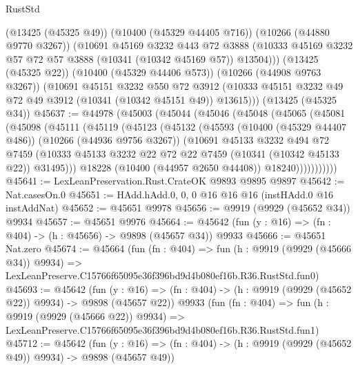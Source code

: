 \begin{lexlean}{RustStd}
\begin{coremodule}
        (@13425 (@45325 @49))
        (@10400 (@45329 @44405 @716))
        (@10266 (@44880 @9770 @3267))
        (@10691
          @45169
          @3232
          @443
          @72
          @3888
          (@10333 @45169 @3232 @57 @72 @57 @3888 (@10341 (@10342 @45169 @57)) @13504)))
      (@13425 (@45325 @22))
      (@10400 (@45329 @44406 @573))
      (@10266 (@44908 @9763 @3267))
      (@10691
        @45151
        @3232
        @550
        @72
        @3912
        (@10333 @45151 @3232 @49 @72 @49 @3912 (@10341 (@10342 @45151 @49)) @13615)))
    (@13425 (@45325 @34))
@45637 := @44978
    (@45003
      (@45044
        (@45046
          (@45048
            (@45065
              (@45081
                (@45098
                  (@45111
                    (@45119
                      (@45123
                        (@45132
                          (@45593
                            (@10400 (@45329 @44407 @486))
                            (@10266 (@44936 @9756 @3267))
                            (@10691
                              @45133
                              @3232
                              @494
                              @72
                              @7459
                              (@10333
                                @45133
                                @3232
                                @22
                                @72
                                @22
                                @7459
                                (@10341 (@10342 @45133 @22))
                                @31495)))
                          @18228
                          (@10400 (@44957 @2650 @44408))
                          @18240)))))))))))
@45641 := LexLeanPreservation.Rust.CrateOK @9893 @9895 @9897
@45642 := Nat.casesOn.{0}
@45651 := HAdd.hAdd.{0, 0, 0} @16 @16 @16 (instHAdd.{0} @16 instAddNat)
@45652 := @45651 @9978
@45656 := @9919 (@9929 (@45652 @34)) @9934
@45657 := @45651 @9976
@45664 := @45642 (fun (y : @16) => (fn : @404) -> (h : @45656) -> @9898 (@45657 @34)) @9933
@45666 := @45651 Nat.zero
@45674 := @45664
    (fun (fn : @404) =>
    fun (h : @9919 (@9929 (@45666 @34)) @9934) =>
    LexLeanPreserve.C15766f65095e36f396bd9d4b080ef16b.R36.RustStd.fun0)
@45693 := @45642
    (fun (y : @16) => (fn : @404) -> (h : @9919 (@9929 (@45652 @22)) @9934) -> @9898 (@45657 @22))
    @9933
    (fun (fn : @404) =>
    fun (h : @9919 (@9929 (@45666 @22)) @9934) =>
    LexLeanPreserve.C15766f65095e36f396bd9d4b080ef16b.R36.RustStd.fun1)
@45712 := @45642
    (fun (y : @16) => (fn : @404) -> (h : @9919 (@9929 (@45652 @49)) @9934) -> @9898 (@45657 @49))

\end{coremodule}
\end{lexlean}
